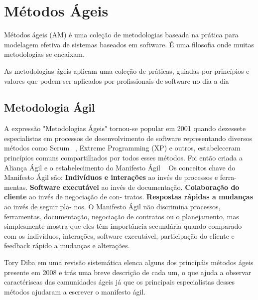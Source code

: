 \chapter{Métodos Ágeis}
\label{cap-metodos-ageis}

Métodos ágeis (AM) é uma coleção de metodologias baseada na prática para 
modelagem efetiva de sistemas baseados em software. É uma filosofia onde muitas metodologias se encaixam.

%
As metodologias ágeis aplicam uma coleção de práticas, guiadas por princípios e valores que podem ser aplicados por profissionais de software no dia a dia~\cite{}%

\section{Metodologia Ágil}
\label{metodologia-agil}

A expressão "Metodologias Ágeis" tornou-se popular em 2001 quando dezessete especialistas em processos de desenvolvimento de software representando diversos métodos como Scrum ~\cite{}, %
Extreme Programming (XP) e outros, estabeleceram princípios comuns compartilhados por todos esses métodos. Foi então criada a Aliança Ágil e o estabelecimento do Manifesto Ágil ~\cite{} %
Os conceitos chave do Manifesto Ágil são:
\textbf{Indivíduos e interações} ao invés de processos e ferra-
mentas.
\textbf{Software executável} ao invés de documentação.
\textbf{Colaboração do cliente} ao invés de negociação de con-
tratos.
\textbf{Respostas rápidas a mudanças} ao invés de seguir pla-
nos.
O Manifesto Ágil não discrimina processos, ferramentas, documentação, negociação de contratos ou o planejamento, mas simplesmente mostra que eles têm importância secundária quando comparado com os indivíduos, interações, software executável, participação do cliente e feedback rápido a mudanças e alterações.

%
Tory Diba em uma revisão sistemática elenca alguns dos principáis métodos ágeis presente em 2008 e trás uma breve descrição de cada um, o que ajuda a observar caractériscas das camunidades ágeis já que os principais especialistas desses métodos ajudaram a escrever o manifesto ágil.\cite{}%

